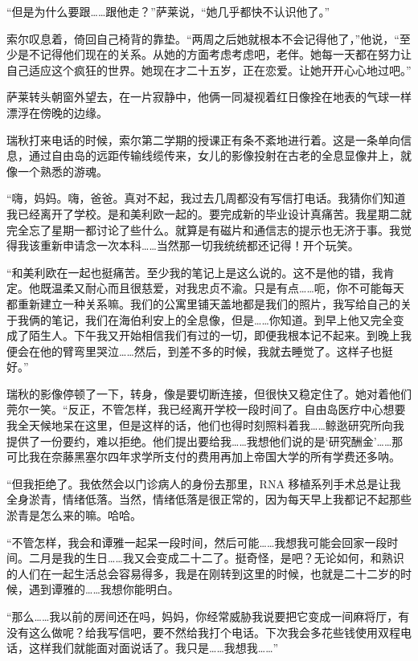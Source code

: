 \documentclass[AutoFakeBold=true]{book}
\begin{document}
``但是为什么要跟……跟他走？''萨莱说，``她几乎都快不认识他了。''

索尔叹息着，倚回自己椅背的靠垫。``两周之后她就根本不会记得他了，''他说，``至少是不记得他们现在的关系。从她的方面考虑考虑吧，老伴。她每一天都在努力让自己适应这个疯狂的世界。她现在才二十五岁，正在恋爱。让她开开心心地过吧。''

萨莱转头朝窗外望去，在一片寂静中，他俩一同凝视着红日像拴在地表的气球一样漂浮在傍晚的边缘。

\vspace*{1em}

瑞秋打来电话的时候，索尔第二学期的授课正有条不紊地进行着。这是一条单向信息，通过自由岛的远距传输线缆传来，女儿的影像投射在古老的全息显像井上，就像一个熟悉的游魂。

``嗨，妈妈。嗨，爸爸。真对不起，我过去几周都没有写信打电话。我猜你们知道我已经离开了学校。是和美利欧一起的。要完成新的毕业设计真痛苦。我星期二就完全忘了星期一都讨论了些什么。就算是有磁片和通信志的提示也无济于事。我觉得我该重新申请念一次本科……当然那一切我统统都还记得！开个玩笑。

``和美利欧在一起也挺痛苦。至少我的笔记上是这么说的。这不是他的错，我肯定。他既温柔又耐心而且很慈爱，对我忠贞不渝。只是有点……呃，你不可能每天都重新建立一种关系嘛。我们的公寓里铺天盖地都是我们的照片，我写给自己的关于我俩的笔记，我们在海伯利安上的全息像，但是……你知道。到早上他又完全变成了陌生人。下午我又开始相信我们有过的一切，即便我根本记不起来。到晚上我便会在他的臂弯里哭泣……然后，到差不多的时候，我就去睡觉了。这样子也挺好。''

瑞秋的影像停顿了一下，转身，像是要切断连接，但很快又稳定住了。她对着他们莞尔一笑。``反正，不管怎样，我已经离开学校一段时间了。自由岛医疗中心想要我全天候地呆在这里，但是这样的话，他们也得时刻照料着我……鲸逖研究所向我提供了一份要约，难以拒绝。他们提出要给我……我想他们说的是`研究酬金'……那可比我在奈藤黑塞尔四年求学所支付的费用再加上帝国大学的所有学费还多呐。

``但我拒绝了。我依然会以门诊病人的身份去那里，RNA 移植系列手术总是让我全身淤青，情绪低落。当然，情绪低落是很正常的，因为每天早上我都记不起那些淤青是怎么来的嘛。哈哈。

``不管怎样，我会和谭雅一起呆一段时间，然后可能……我想我可能会回家一段时间。二月是我的生日……我又会变成二十二了。挺奇怪，是吧？无论如何，和熟识的人们在一起生活总会容易得多，我是在刚转到这里的时候，也就是二十二岁的时候，遇到谭雅的……我想你能明白。

``那么……我以前的房间还在吗，妈妈，你经常威胁我说要把它变成一间麻将厅，有没有这么做呢？给我写信吧，要不然给我打个电话。下次我会多花些钱使用双程电话，这样我们就能面对面说话了。我只是……我想我……''
\end{document}

